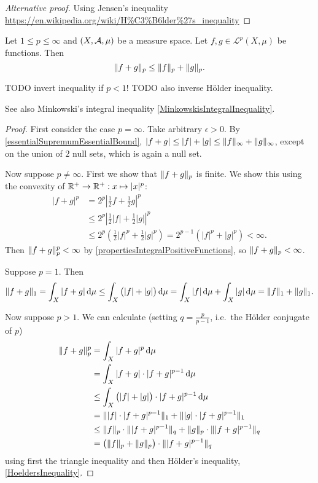\begin{proof}[Alternative proof]
Using Jensen's inequality \url{https://en.wikipedia.org/wiki/H%C3%B6lder%27s_inequality}
\end{proof}


\begin{theorem} \label{MinkowskisInequality}
Let $1 \leq p \leq \infty$ and $\sSet{X,\mathcal{A},\mu}$ be a measure space. Let $f,g\in\mathcal{L}^p(X,\mu)$ be functions. Then
\[ \lVert f+g\rVert_p \leq \lVert f\rVert_p + \lVert g\rVert_p. \]
\end{theorem}
TODO invert inequality if $p<1$! TODO also inverse Hölder inequality.

See also Minkowski's integral inequality \ref{MinkowskisIntegralInequality}.
\begin{proof}
First consider the case $p = \infty$. Take arbitrary $\epsilon > 0$. By \ref{essentialSupremumEssentialBound}, $|f+g| \leq |f|+|g| \leq \lVert f\rVert_\infty + \lVert g\rVert_\infty$, except on the union of $2$ null sets, which is again a null set.

Now suppose $p \neq \infty$. First we show that $\lVert f+g\rVert_p$ is finite. We show this using the convexity of $\mathbb{R}^+\to \mathbb{R}^+: x\mapsto |x|^p$:
\begin{align*}
|f+g|^p &= 2^p\left|\frac{1}{2}f+ \frac{1}{2}g\right|^p \\
&\leq 2^p\left|\frac{1}{2}|f|+ \frac{1}{2}|g|\right|^p \\
&\leq 2^p\left(\frac{1}{2}|f|^p + \frac{1}{2}|g|^p\right) = 2^{p-1}\left(|f|^p + |g|^p\right) < \infty.
\end{align*}
Then $\lVert f+g\rVert_p^p < \infty$ by \ref{propertiesIntegralPositiveFunctions}, so $\lVert f+g\rVert_p < \infty$.

Suppose $p=1$. Then
\[ \lVert f+g\rVert_1 = \int_X|f+g|\operatorname{d \!}{\mu} \leq \int_X \big(|f|+ |g|\big)\operatorname{d \!}{\mu} = \int_X|f|\operatorname{d \!}{\mu} + \int_X|g|\operatorname{d \!}{\mu} = \lVert f\rVert_1 + \lVert g\rVert_1. \]

Now suppose $p>1$. We can calculate (setting $q = \frac{p}{p-1}$, i.e.\ the Hölder conjugate of $p$)
\begin{align*}
\lVert f+g\rVert_p^p &= \int_X|f+g|^p\operatorname{d \!}{\mu} \\
&= \int_X|f+g|\cdot |f+g|^{p-1}\operatorname{d \!}{\mu} \\
&\leq \int_X\big(|f|+|g|\big)\cdot |f+g|^{p-1}\operatorname{d \!}{\mu} \\
&= \lVert|f|\cdot |f+g|^{p-1}\rVert_1 + \lVert|g|\cdot |f+g|^{p-1}\rVert_1 \\
&\leq \lVert f\rVert_p\cdot \lVert|f+g|^{p-1}\rVert_q + \lVert g\rVert_p\cdot \lVert|f+g|^{p-1}\rVert_q \\
&= \big(\lVert f\rVert_p + \lVert g\rVert_p\big)\cdot \lVert|f+g|^{p-1}\rVert_q
\end{align*}
using first the triangle inequality and then Hölder's inequality, \ref{HoeldersInequality}.


\end{proof}
